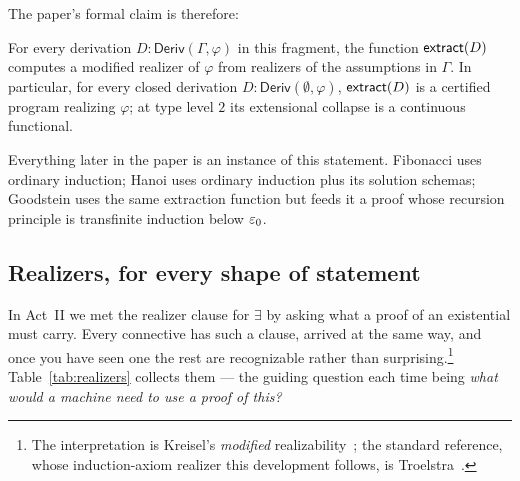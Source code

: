 \documentclass[11pt]{article}
\begin{document}
The paper's formal claim is therefore:
\begin{keystmt}
For every derivation $D:\mathsf{Deriv}(\Gamma,\varphi)$ in this fragment, the
function $\mathsf{extract}(D)$ computes a modified realizer of $\varphi$ from
realizers of the assumptions in $\Gamma$. In particular, for every closed
derivation $D:\mathsf{Deriv}(\emptyset,\varphi)$, $\mathsf{extract}(D)$ is a certified
program realizing $\varphi$; at type level $2$ its extensional collapse is a
continuous functional.
\end{keystmt}
Everything later in the paper is an instance of this statement. Fibonacci
uses ordinary induction; Hanoi uses ordinary induction plus its solution
schemas; Goodstein uses the same extraction function but feeds it a proof
whose recursion principle is transfinite induction below $\varepsilon_0$.

\subsection*{Realizers, for every shape of statement}

In Act~II we met the realizer clause for $\exists$ by asking what a proof of
an existential must carry. Every connective has such a clause, arrived at the
same way, and once you have seen one the rest are recognizable rather than
surprising.\footnote{The interpretation is Kreisel's \emph{modified}
realizability~\citep{kreisel1959}; the standard reference, whose
induction-axiom realizer this development follows, is
Troelstra~\citep{troelstra1973}.} Table~\ref{tab:realizers} collects them --- the guiding question
each time being \emph{what would a machine need to use a proof of this?}
\end{document}
